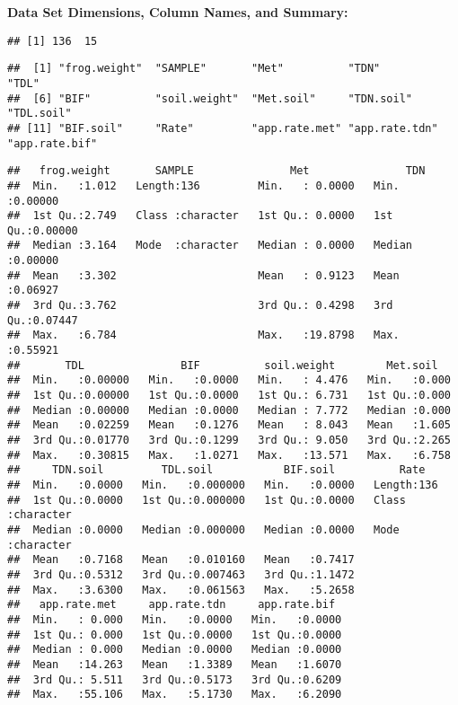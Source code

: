 \documentclass[
]{article}
\begin{document}
\textbf{Data Set Dimensions, Column Names, and Summary:}

\begin{verbatim}
## [1] 136  15
\end{verbatim}

\begin{verbatim}
##  [1] "frog.weight"  "SAMPLE"       "Met"          "TDN"          "TDL"         
##  [6] "BIF"          "soil.weight"  "Met.soil"     "TDN.soil"     "TDL.soil"    
## [11] "BIF.soil"     "Rate"         "app.rate.met" "app.rate.tdn" "app.rate.bif"
\end{verbatim}

\begin{verbatim}
##   frog.weight       SAMPLE               Met               TDN         
##  Min.   :1.012   Length:136         Min.   : 0.0000   Min.   :0.00000  
##  1st Qu.:2.749   Class :character   1st Qu.: 0.0000   1st Qu.:0.00000  
##  Median :3.164   Mode  :character   Median : 0.0000   Median :0.00000  
##  Mean   :3.302                      Mean   : 0.9123   Mean   :0.06927  
##  3rd Qu.:3.762                      3rd Qu.: 0.4298   3rd Qu.:0.07447  
##  Max.   :6.784                      Max.   :19.8798   Max.   :0.55921  
##       TDL               BIF          soil.weight        Met.soil    
##  Min.   :0.00000   Min.   :0.0000   Min.   : 4.476   Min.   :0.000  
##  1st Qu.:0.00000   1st Qu.:0.0000   1st Qu.: 6.731   1st Qu.:0.000  
##  Median :0.00000   Median :0.0000   Median : 7.772   Median :0.000  
##  Mean   :0.02259   Mean   :0.1276   Mean   : 8.043   Mean   :1.605  
##  3rd Qu.:0.01770   3rd Qu.:0.1299   3rd Qu.: 9.050   3rd Qu.:2.265  
##  Max.   :0.30815   Max.   :1.0271   Max.   :13.571   Max.   :6.758  
##     TDN.soil         TDL.soil           BIF.soil          Rate          
##  Min.   :0.0000   Min.   :0.000000   Min.   :0.0000   Length:136        
##  1st Qu.:0.0000   1st Qu.:0.000000   1st Qu.:0.0000   Class :character  
##  Median :0.0000   Median :0.000000   Median :0.0000   Mode  :character  
##  Mean   :0.7168   Mean   :0.010160   Mean   :0.7417                     
##  3rd Qu.:0.5312   3rd Qu.:0.007463   3rd Qu.:1.1472                     
##  Max.   :3.6300   Max.   :0.061563   Max.   :5.2658                     
##   app.rate.met     app.rate.tdn     app.rate.bif   
##  Min.   : 0.000   Min.   :0.0000   Min.   :0.0000  
##  1st Qu.: 0.000   1st Qu.:0.0000   1st Qu.:0.0000  
##  Median : 0.000   Median :0.0000   Median :0.0000  
##  Mean   :14.263   Mean   :1.3389   Mean   :1.6070  
##  3rd Qu.: 5.511   3rd Qu.:0.5173   3rd Qu.:0.6209  
##  Max.   :55.106   Max.   :5.1730   Max.   :6.2090
\end{verbatim}
\end{document}
